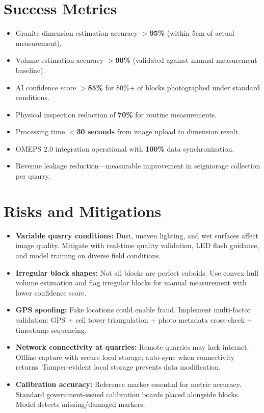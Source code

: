 \documentclass[11pt,a4paper]{article}
\begin{document}
\section{Success Metrics}

\begin{itemize}[leftmargin=1.5em, itemsep=4pt]
  \item Granite dimension estimation accuracy $>$\textbf{95\%} (within 5cm of actual measurement).
  \item Volume estimation accuracy $>$\textbf{90\%} (validated against manual measurement baseline).
  \item AI confidence score $>$\textbf{85\%} for 80\%+ of blocks photographed under standard conditions.
  \item Physical inspection reduction of \textbf{70\%} for routine measurements.
  \item Processing time $<$\textbf{30 seconds} from image upload to dimension result.
  \item OMEPS 2.0 integration operational with \textbf{100\%} data synchronization.
  \item Revenue leakage reduction---measurable improvement in seigniorage collection per quarry.
\end{itemize}

\newpage
\section{Risks and Mitigations}

\begin{itemize}[leftmargin=1.5em, itemsep=4pt]
  \item \textbf{Variable quarry conditions:} Dust, uneven lighting, and wet surfaces affect image quality. Mitigate with real-time quality validation, LED flash guidance, and model training on diverse field conditions.
  \item \textbf{Irregular block shapes:} Not all blocks are perfect cuboids. Use convex hull volume estimation and flag irregular blocks for manual measurement with lower confidence score.
  \item \textbf{GPS spoofing:} Fake locations could enable fraud. Implement multi-factor validation: GPS + cell tower triangulation + photo metadata cross-check + timestamp sequencing.
  \item \textbf{Network connectivity at quarries:} Remote quarries may lack internet. Offline capture with secure local storage; auto-sync when connectivity returns. Tamper-evident local storage prevents data modification.
  \item \textbf{Calibration accuracy:} Reference marker essential for metric accuracy. Standard government-issued calibration boards placed alongside blocks. Model detects missing/damaged markers.
\end{itemize}
\end{document}
